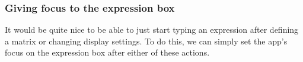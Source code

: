 \documentclass[../development.tex]{subfiles}
\begin{document}
\subsubsection{Giving focus to the expression box\label{development:fixing-bugs-and-adding-polish:giving-focus-to-the-expression-box}}

It would be quite nice to be able to just start typing an expression after defining a matrix or changing display settings. To do this, we can simply set the app's focus on the expression box after either of these actions.

\end{document}
